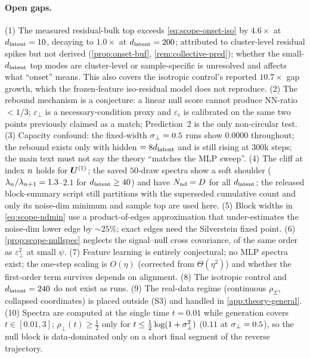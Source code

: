 \paragraph{Open gaps.}
(1) The measured residual-bulk top exceeds \eqref{eq:scope-onset-iso} by $4.6\times$ at $d_{\mathrm{latent}}=10$, decaying to $1.0\times$ at $d_{\mathrm{latent}}=200$; attributed to cluster-level residual spikes but not derived (\cref{prop:onset-buf}, \cref{rem:collective-pred}); whether the small-$d_{\mathrm{latent}}$ top modes are cluster-level or sample-specific is unresolved and affects what ``onset'' means. This also covers the isotropic control's reported $10.7\times$ gap growth, which the frozen-feature iso-residual model does not reproduce. (2) The rebound mechanism is a conjecture: a linear null score cannot produce NN-ratio $<1/3$; $\varepsilon_\perp$ is a necessary-condition proxy and $\varepsilon_c$ is calibrated on the same two points previously claimed as a match; Prediction~2 is the only non-circular test. (3) Capacity confound: the fixed-width $\sigma_{\perp}=0.5$ runs show $0.0000$ throughout; the rebound exists only with hidden $=8d_{\mathrm{latent}}$ and is still rising at $300$k steps; the main text must not say the theory ``matches the MLP sweep''. (4) The cliff at index $n$ holds for $\bm{U}^{(1)}$; the saved $50$-draw spectra show a soft shoulder ($\lambda_n/\lambda_{n+1}=1.3$--$2.1$ for $d_{\mathrm{latent}}\ge40$) and have $N_{\rm nd}=D$ for all $d_{\mathrm{latent}}$; the released block-summary script still partitions with the superseded cumulative count and only its noise-dim minimum and sample top are used here. (5) Block widths in \eqref{eq:scope-ndmin} use a product-of-edges approximation that under-estimates the noise-dim lower edge by $\sim25\%$; exact edges need the Silverstein fixed point. (6) \cref{prop:scope-nullspec} neglects the signal--null cross covariance, of the same order as $\varepsilon_\perp^2$ at small $\psi$. (7) Feature learning is entirely conjectural; no MLP spectra exist; the one-step scaling is $O(\eta)$ (corrected from $\Theta(\eta^2)$) and whether the first-order term survives depends on alignment. (8) The isotropic control and $d_{\mathrm{latent}}=240$ do not exist as runs. (9) The real-data regime (continuous $\rho_\Sigma$, collapsed coordinates) is placed outside (S3) and handled in \cref{app:theory-general}. (10) Spectra are computed at the single time $t=0.01$ while generation covers $t\in[0.01,3]$; $\rho_\perp(t)\ge\tfrac12$ only for $t\le\tfrac12\log(1+\sigma_{\perp}^2)$ ($0.11$ at $\sigma_{\perp}=0.5$), so the null block is data-dominated only on a short final segment of the reverse trajectory.

